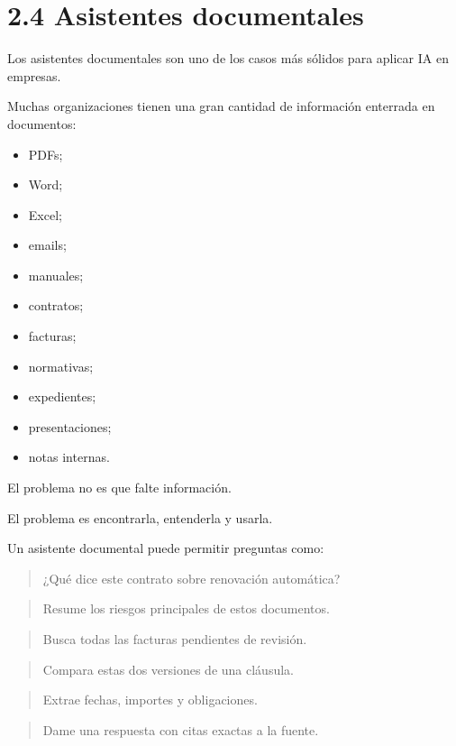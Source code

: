 \section{2.4 Asistentes documentales}\label{asistentes-documentales}

Los asistentes documentales son uno de los casos más sólidos para
aplicar IA en empresas.

Muchas organizaciones tienen una gran cantidad de información enterrada
en documentos:

\begin{itemize}
\tightlist
\item
  PDFs;
\item
  Word;
\item
  Excel;
\item
  emails;
\item
  manuales;
\item
  contratos;
\item
  facturas;
\item
  normativas;
\item
  expedientes;
\item
  presentaciones;
\item
  notas internas.
\end{itemize}

El problema no es que falte información.

El problema es encontrarla, entenderla y usarla.

Un asistente documental puede permitir preguntas como:

\begin{quote}
¿Qué dice este contrato sobre renovación automática?
\end{quote}

\begin{quote}
Resume los riesgos principales de estos documentos.
\end{quote}

\begin{quote}
Busca todas las facturas pendientes de revisión.
\end{quote}

\begin{quote}
Compara estas dos versiones de una cláusula.
\end{quote}

\begin{quote}
Extrae fechas, importes y obligaciones.
\end{quote}

\begin{quote}
Dame una respuesta con citas exactas a la fuente.
\end{quote}

